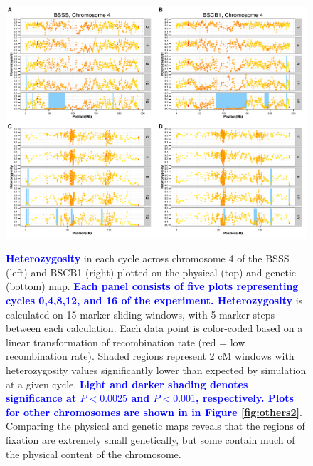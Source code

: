 \documentclass[twocolumn,twoside,letterpaper]{article}
\newcommand{\rev}[1]{\textcolor{blue}{\bf #1}}
\begin{document}
\begin{figure}[tb]   
  \begin{center}
   \includegraphics[width=0.8\linewidth]{Fig4/chrom4_combined}
   \caption{\rev{Heterozygosity} in each cycle across chromosome 4 of the BSSS (left) and  BSCB1 (right) plotted on the physical (top) and genetic (bottom) map. \rev{Each panel consists of five plots representing cycles 0,4,8,12, and 16 of the experiment. Heterozygosity} is calculated on 15-marker sliding windows, with 5 marker steps between each calculation. Each data point is color-coded based on a linear transformation of recombination rate (red = low recombination rate). Shaded regions represent 2 cM windows with heterozygosity values significantly lower than expected by simulation at a given cycle. \rev{Light and darker shading denotes significance at $P<0.0025$ and $P<0.001$, respectively. Plots for other chromosomes are shown in in Figure \ref{fig:others2}}. Comparing the physical and genetic maps reveals that the regions of fixation are extremely small genetically, but some contain much of the physical content of the chromosome.
} 
\vspace{-6mm}
    \label{fig:genphys}
  \end{center}
\end{figure}
\end{document}
